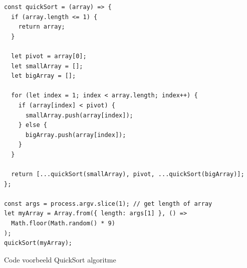 \begin{listing}[H]
    \centering
    \begin{verbatim}
const quickSort = (array) => {
  if (array.length <= 1) {
    return array;
  }

  let pivot = array[0];
  let smallArray = [];
  let bigArray = [];

  for (let index = 1; index < array.length; index++) {
    if (array[index] < pivot) {
      smallArray.push(array[index]);
    } else {
      bigArray.push(array[index]);
    }
  }

  return [...quickSort(smallArray), pivot, ...quickSort(bigArray)];
};

const args = process.argv.slice(1); // get length of array
let myArray = Array.from({ length: args[1] }, () =>
  Math.floor(Math.random() * 9)
);
quickSort(myArray);
        \end{verbatim}
        \caption[QuickSort algoritme]{\label{code:quicksort}Code voorbeeld QuickSort algoritme}
\end{listing}

